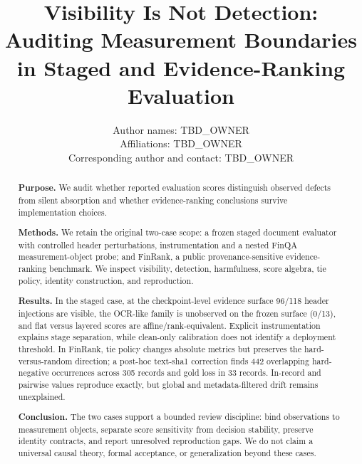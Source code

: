 \documentclass[10pt]{article}
\begin{document}
\title{Visibility Is Not Detection: Auditing Measurement Boundaries in Staged and Evidence-Ranking Evaluation}
\author{Author names: TBD\_OWNER\\Affiliations: TBD\_OWNER\\Corresponding author and contact: TBD\_OWNER}
\date{}
\maketitle
\begin{abstract}
\noindent\textbf{Purpose.} We audit whether reported evaluation scores distinguish observed defects from silent absorption and whether evidence-ranking conclusions survive implementation choices.

\medskip\noindent\textbf{Methods.} We retain the original two-case scope: a frozen staged document evaluator with controlled header perturbations, instrumentation and a nested FinQA measurement-object probe; and FinRank, a public provenance-sensitive evidence-ranking benchmark. We inspect visibility, detection, harmfulness, score algebra, tie policy, identity construction, and reproduction.

\medskip\noindent\textbf{Results.} In the staged case, at the checkpoint-level evidence surface 96/118 header injections are visible, the OCR-like family is unobserved on the frozen surface (0/13), and flat versus layered scores are affine/rank-equivalent. Explicit instrumentation explains stage separation, while clean-only calibration does not identify a deployment threshold. In FinRank, tie policy changes absolute metrics but preserves the hard-versus-random direction; a post-hoc text-sha1 correction finds 442 overlapping hard-negative occurrences across 305 records and gold loss in 33 records. In-record and pairwise values reproduce exactly, but global and metadata-filtered drift remains unexplained.

\medskip\noindent\textbf{Conclusion.} The two cases support a bounded review discipline: bind observations to measurement objects, separate score sensitivity from decision stability, preserve identity contracts, and report unresolved reproduction gaps. We do not claim a universal causal theory, formal acceptance, or generalization beyond these cases.
\end{abstract}
\end{document}
